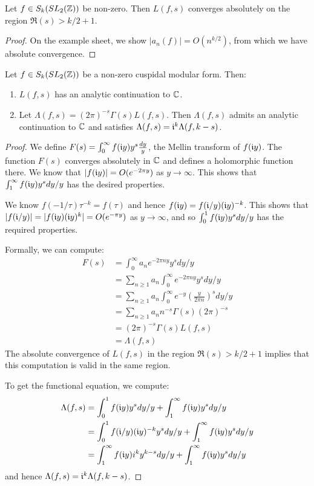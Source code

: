 \documentclass[10pt,a4paper]{article}
\begin{document}
\begin{lemma}
  Let $f \in S_k(SL_2(\mathbb{Z}))$ be non-zero. Then $L(f,s)$ converges absolutely on the region $\Re(s) > k/2 + 1$.
\end{lemma}
\begin{proof}
  On the example sheet, we show $|a_n(f)| = O(n^{k/2})$, from which we have absolute convergence.
\end{proof}
\begin{theorem}
  Let $f \in S_k(SL_2(\mathbb{Z}))$ be a non-zero cuspidal modular form. Then:
  \begin{enumerate}
    \item $L(f,s)$ has an analytic continuation to $\mathbb{C}$.
    \item Let $\Lambda(f,s) = (2\pi)^{-s}\Gamma(s)L(f,s)$. Then $\Lambda(f,s)$ admits an analytic continuation to $\mathbb{C}$ and satisfies $\Lambda(f,s) = \mathfrak{i}^k \Lambda(f, k-s)$.
  \end{enumerate}
\end{theorem}
\begin{proof}
  We define $F(s) = \int_0^\infty f(\mathfrak{i} y) y^s \frac{dy}{y}$, the Mellin transform of $f(\mathfrak{i} y)$. The function $F(s)$ converges absolutely in $\mathbb{C}$ and defines a holomorphic function there. We know that $|f(\mathfrak{i} y)| = O(e^{-2\pi y})$ as $y \to \infty$. This shows that $\int_1^\infty f(\mathfrak{i} y) y^s dy/y$ has the desired properties.

  We know $f(-1/\tau)\tau^{-k} = f(\tau)$ and hence $f(\mathfrak{i} y) = f(\mathfrak{i}/y)(\mathfrak{i} y)^{-k}$. This shows that $|f(\mathfrak{i}/y)| = |f(\mathfrak{i} y) (\mathfrak{i} y)^{k}| = O(e^{-\pi y})$ as $y \to \infty$, and so $\int_0^1 f(\mathfrak{i} y) y^s  dy/y$ has the required properties.

  Formally, we can compute:
  \begin{align*}
    F(s) &= \int_0^\infty a_n e^{-2\pi n y} y^s dy/y\\
    &= \sum_{n \geq 1} a_n \int_{0}^\infty e^{-2\pi n y}y^s dy/y\\
    &= \sum_{n \geq 1} a_n \int_0^\infty e^{-y}\left(\frac{y}{2\pi n}\right)^s dy/y\\
    &= \sum_{n \geq 1} a_n n^{-s} \Gamma(s) (2\pi)^{-s}\\
    &= (2\pi)^{-s}\Gamma(s) L(f,s)\\
    &= \Lambda(f,s)
  \end{align*}
  The absolute convergence of $L(f,s)$ in the region $\Re(s) > k/2 + 1$ implies that this computation is valid in the same region.

  To get the functional equation, we compute:
  \begin{align*}
    \Lambda(f,s) &= \int_0^1 f(\mathfrak{i} y) y^s dy/y + \int_1^\infty f(\mathfrak{i} y)y^s dy/y\\
    &= \int_0^1 f(\mathfrak{i}/y) (\mathfrak{i} y)^{-k} y^s dy/y + \int_1^\infty f(\mathfrak{i} y)y^s dy/y\\
    &= \int_1^\infty f(\mathfrak{i} y) i^k y^{k-s} dy/y + \int_1^\infty f(\mathfrak{i} y) y^s dy/y
  \end{align*}
  and hence $\Lambda(f,s) = \mathfrak{i} ^k \Lambda(f, k-s)$.
\end{proof}
\end{document}
